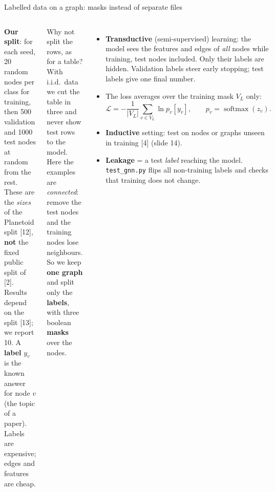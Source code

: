 \documentclass[aspectratio=169,10pt]{beamer}
\DeclareMathOperator{\softmax}{softmax}
\renewcommand{\cite}[1]{{\scriptsize\color{cTok}[#1]}}
\newcommand{\key}[1]{\textbf{\color{cAtt}#1}}
\begin{document}
\begin{frame}{Labelled data on a graph: masks instead of separate files}
\begin{columns}[T,onlytextwidth]
\vspace{1mm}
\raggedright\footnotesize
\textbf{Our split}: for each seed, 20 random nodes per class for training, then 500 validation and
1000 test nodes at random from the rest. These are the \emph{sizes} of the Planetoid split \cite{12},
\textbf{not} the fixed public split of \cite{2}. Results depend on the split \cite{13}; we report 10.
\footnotesize
A \key{label} $y_v$ is the known answer for node $v$ (the topic of a paper). Labels are expensive;
edges and features are cheap.
\begin{block}{Why not split the rows, as for a table?}
\footnotesize
With i.i.d.\ data we cut the table in three and never show test rows to the model.
Here the examples are \emph{connected}: remove the test nodes and the training nodes lose
neighbours. So we keep \textbf{one graph} and split only the \textbf{labels}, with three boolean
\key{masks} over the nodes.
\end{block}
\vspace{-0.5mm}
\begin{itemize}\footnotesize
  \item \key{Transductive} (semi-supervised) learning: the model sees the features and edges of
        \emph{all} nodes while training, test nodes included. Only their labels are hidden.
        Validation labels steer early stopping; test labels give one final number.
  \item The loss averages over the training mask $V_L$ only:
        \vspace{-1.5mm}\[\textstyle \mathcal L=-\frac1{|V_L|}\sum_{v\in V_L}\ln p_v[y_v],\qquad p_v=\softmax(z_v).\]
        \vspace{-5mm}
  \item \key{Inductive} setting: test on nodes or graphs unseen in training \cite{4} (slide 14).
  \item \textbf{Leakage} = a test \emph{label} reaching the model. \texttt{test\_gnn.py} flips all
        non-training labels and checks that training does not change.
\end{itemize}
\end{columns}
\end{frame}
\end{document}
